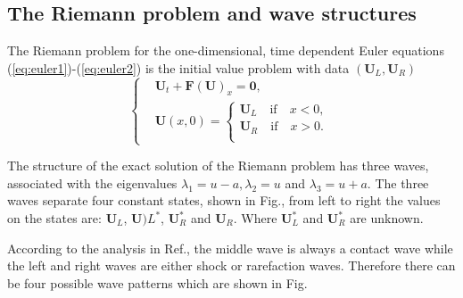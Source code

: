 \documentclass[review]{elsarticle}
\begin{document}
\subsection{The Riemann problem and wave structures }
The Riemann problem for the one-dimensional, time dependent Euler equations (\ref{eq:euler1})-(\ref{eq:euler2})  is the initial value problem with data $(\mathbf{U}_L, \mathbf{U}_R)$
\begin{equation}
  \left\{ \begin{aligned}
 & \mathbf{U}_t +\mathbf{F}(\mathbf{U})_x = \mathbf{0},\\
 & \mathbf{U}(x,0) = \left\{ \begin{aligned} 
	  \mathbf{U}_L \quad \text{if} \quad  x<0, \\
	  \mathbf{U}_R \quad \text{if} \quad  x>0. \\
  \end{aligned}\right.
\end{aligned}\right.
\end{equation}

The structure of the exact solution of the Riemann problem has three waves, associated with the eigenvalues $\lambda_1 = u-a,\lambda_2 = u$ and $\lambda_3 = u+a$. The three waves separate four constant states, shown in Fig., from left to right the values on the states are: $\mathbf{U}_L$, $\mathbf{U})L^*$, $\mathbf{U}_R^*$ and $\mathbf{U}_R$. Where $\mathbf{U}_L^*$ and $\mathbf{U}_R^*$ are unknown.

According to the analysis in Ref.\cite{toro2013riemann}, the middle wave is always a contact wave while the left and right waves are either shock or rarefaction waves. Therefore there can be four possible wave patterns which are shown in Fig. 
\end{document}
